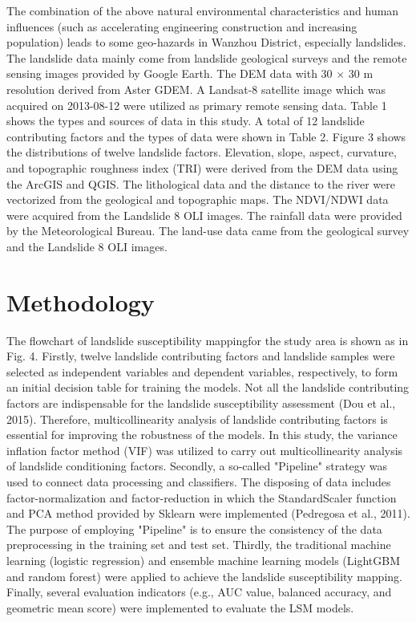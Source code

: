 \documentclass[a4paper,fleqn]{cas-sc}
\begin{document}
The combination of the above natural environmental characteristics and human influences (such as accelerating engineering construction and increasing population) leads to some geo-hazards in Wanzhou District, especially landslides. 
The landslide data mainly come from landslide geological surveys and the remote sensing images provided by Google Earth. 
The DEM data with 30 $\times$ 30 m resolution derived from Aster GDEM. 
A Landsat-8 satellite image which was acquired on 2013-08-12 were utilized as primary remote sensing data. 
Table 1 shows the types and sources of data in this study. 
A total of 12 landslide contributing factors and the types of data were shown in Table 2. 
Figure 3 shows the distributions of twelve landslide factors. 
Elevation, slope, aspect, curvature, and topographic roughness index (TRI) were derived from the DEM data using the ArcGIS and QGIS. The lithological data and the distance to the river were vectorized from the geological and topographic maps. 
The NDVI/NDWI data were acquired from the Landslide 8 OLI images. 
The rainfall data were provided by the Meteorological Bureau. 
The land-use data came from the geological survey and the Landslide 8 OLI images.

\section{Methodology}

The flowchart of landslide susceptibility mappingfor the study area is shown as in Fig. 4. 
Firstly, twelve landslide contributing factors and landslide samples were selected as independent variables and dependent variables, respectively, to form an initial decision table for training the models. 
Not all the landslide contributing factors are indispensable for the landslide susceptibility assessment (Dou et al., 2015). 
Therefore, multicollinearity analysis of landslide contributing factors is essential for improving the robustness of the models. 
In this study, the variance inflation factor method (VIF) was utilized to carry out multicollinearity analysis of landslide conditioning factors. 
Secondly, a so-called "Pipeline" strategy was used to connect data processing and classifiers. 
The disposing of data includes factor-normalization and factor-reduction in which the StandardScaler function and PCA method provided by Sklearn were implemented (Pedregosa et al., 2011). 
The purpose of employing "Pipeline" is to ensure the consistency of the data preprocessing in the training set and test set. 
Thirdly, the traditional machine learning (logistic regression) and ensemble machine learning models (LightGBM and random forest) were applied to achieve the landslide susceptibility mapping. 
Finally, several evaluation indicators (e.g., AUC value, balanced accuracy, and geometric mean score) were implemented to evaluate the LSM models.
\end{document}

